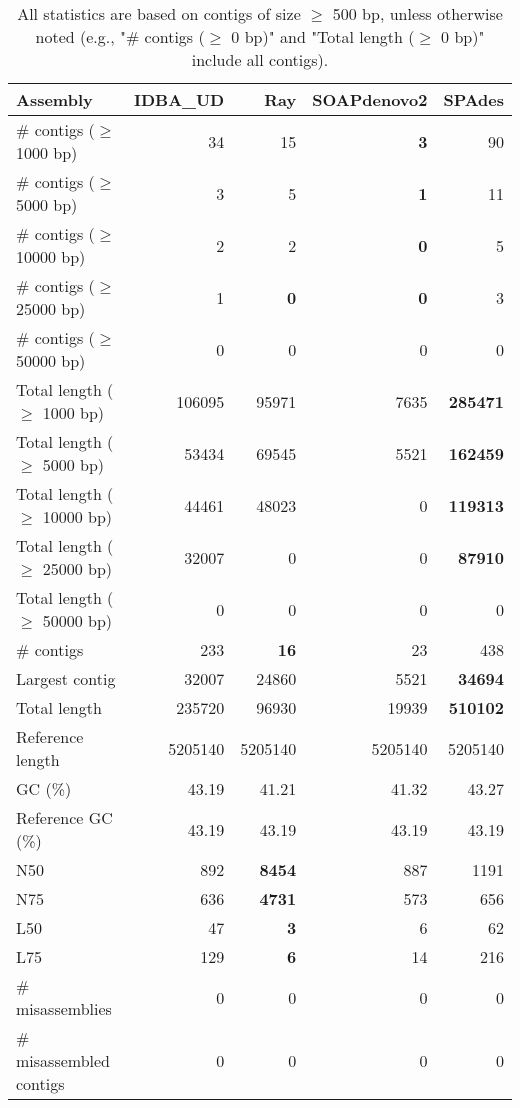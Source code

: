 \documentclass[12pt,a4paper]{article}
\begin{document}
\begin{table}[ht]
\begin{center}
\caption{All statistics are based on contigs of size $\geq$ 500 bp, unless otherwise noted (e.g., "\# contigs ($\geq$ 0 bp)" and "Total length ($\geq$ 0 bp)" include all contigs).}
\begin{tabular}{|l*{4}{|r}|}
\hline
Assembly & IDBA\_UD & Ray & SOAPdenovo2 & SPAdes \\ \hline
\# contigs ($\geq$ 1000 bp) & 34 & 15 & {\bf 3} & 90 \\ \hline
\# contigs ($\geq$ 5000 bp) & 3 & 5 & {\bf 1} & 11 \\ \hline
\# contigs ($\geq$ 10000 bp) & 2 & 2 & {\bf 0} & 5 \\ \hline
\# contigs ($\geq$ 25000 bp) & 1 & {\bf 0} & {\bf 0} & 3 \\ \hline
\# contigs ($\geq$ 50000 bp) & 0 & 0 & 0 & 0 \\ \hline
Total length ($\geq$ 1000 bp) & 106095 & 95971 & 7635 & {\bf 285471} \\ \hline
Total length ($\geq$ 5000 bp) & 53434 & 69545 & 5521 & {\bf 162459} \\ \hline
Total length ($\geq$ 10000 bp) & 44461 & 48023 & 0 & {\bf 119313} \\ \hline
Total length ($\geq$ 25000 bp) & 32007 & 0 & 0 & {\bf 87910} \\ \hline
Total length ($\geq$ 50000 bp) & 0 & 0 & 0 & 0 \\ \hline
\# contigs & 233 & {\bf 16} & 23 & 438 \\ \hline
Largest contig & 32007 & 24860 & 5521 & {\bf 34694} \\ \hline
Total length & 235720 & 96930 & 19939 & {\bf 510102} \\ \hline
Reference length & 5205140 & 5205140 & 5205140 & 5205140 \\ \hline
GC (\%) & 43.19 & 41.21 & 41.32 & 43.27 \\ \hline
Reference GC (\%) & 43.19 & 43.19 & 43.19 & 43.19 \\ \hline
N50 & 892 & {\bf 8454} & 887 & 1191 \\ \hline
N75 & 636 & {\bf 4731} & 573 & 656 \\ \hline
L50 & 47 & {\bf 3} & 6 & 62 \\ \hline
L75 & 129 & {\bf 6} & 14 & 216 \\ \hline
\# misassemblies & 0 & 0 & 0 & 0 \\ \hline
\# misassembled contigs & 0 & 0 & 0 & 0 \\ \hline

\end{tabular}
\end{center}
\end{table}
\end{document}
